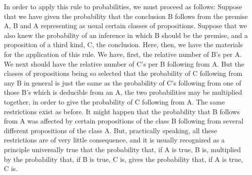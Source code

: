 In order to apply this rule to probabilities, we must proceed as follows: Suppose that we have given the probability that the conclusion B follows from the premise A, B and A representing as usual certain classes of propositions. Suppose that we also knew the probability of an inference in which B should be the premise, and a proposition of a third kind, C, the conclusion. Here, then, we have the materials for the application of this rule. We have, first, the relative number of B's per A. We next should have the relative number of C's per B following from A. But the classes of propositions being so selected that the probability of C following from any B in general is just the same as the probability of C's following from one of those B's which is deducible from an A, the two probabilities may be multiplied together, in order to give the probability of C following from A. The same restrictions exist as before. It might happen that the probability that B follows from A was affected by certain propositions of the class B following from several different propositions of the class A. But, practically speaking, all these restrictions are of very little consequence, and it is usually recognized as a principle universally true that the probability that, if A is true, B is, multiplied by the probability that, if B is true, C is, gives the probability that, if A is true, C is.

